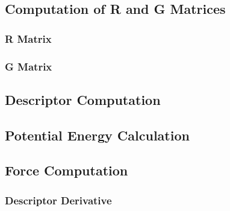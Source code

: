 \documentclass[a4paper,11pt,oneside]{article}
\begin{document}
\subsection{Computation of R and G Matrices}
\subsubsection{R Matrix}

\subsubsection{G Matrix}

\subsection{Descriptor Computation}

\subsection{Potential Energy Calculation}

\subsection{Force Computation}
\subsubsection{Descriptor Derivative}
\end{document}
